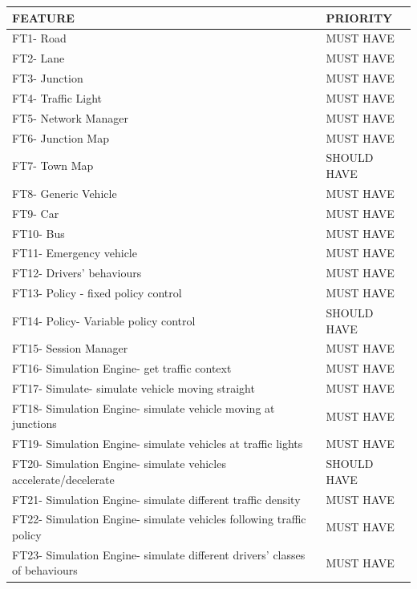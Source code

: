 \documentclass[11pt]{article}
\begin{document}
{\begin{itemize}
\begin{itemize}
\begin{table}[H]
        \begin{tabular}{l|l}
             FEATURE & PRIORITY \\ \hline
             FT1- Road & MUST HAVE \\ \hline
             FT2- Lane & MUST HAVE \\ \hline
             FT3- Junction & MUST HAVE \\ \hline
             FT4- Traffic Light & MUST HAVE \\ \hline
             FT5- Network Manager & MUST HAVE \\ \hline
             FT6- Junction Map & MUST HAVE \\ \hline
             FT7- Town Map & SHOULD HAVE \\ \hline
             FT8- Generic Vehicle & MUST HAVE \\ \hline
             FT9- Car  & MUST HAVE \\ \hline
             FT10- Bus & MUST HAVE \\ \hline
             FT11- Emergency vehicle & MUST HAVE \\ \hline
             FT12- Drivers' behaviours & MUST HAVE \\ \hline
             FT13- Policy - fixed policy control  & MUST HAVE \\ \hline
             FT14- Policy- Variable policy control& SHOULD HAVE \\ \hline
             FT15- Session Manager  & MUST HAVE \\ \hline
             FT16- Simulation Engine- get traffic context & MUST HAVE \\ \hline
             FT17- Simulate- simulate vehicle moving straight & MUST HAVE \\ \hline
             FT18- Simulation Engine- simulate vehicle moving at junctions& MUST HAVE \\ \hline
             FT19- Simulation Engine- simulate vehicles at traffic lights & MUST HAVE \\ \hline
             FT20- Simulation Engine- simulate vehicles accelerate/decelerate & SHOULD HAVE \\ \hline
             FT21- Simulation Engine- simulate different traffic density & MUST HAVE \\ \hline
             FT22- Simulation Engine- simulate vehicles following traffic policy & MUST HAVE \\ \hline
             FT23- Simulation Engine- simulate different drivers' classes of behaviours & MUST HAVE \\ \hline

\end{tabular}
\end{table}
\end{itemize}
\end{itemize}}
\end{document}
